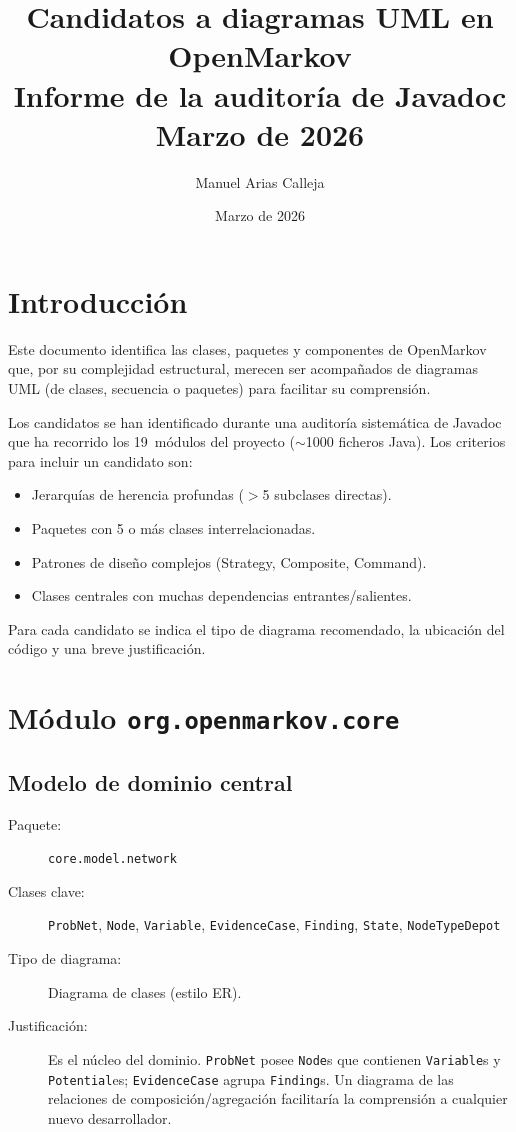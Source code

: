\documentclass[11pt,a4paper]{article}
\title{Candidatos a diagramas UML en OpenMarkov\\
       \large Informe de la auditor\'ia de Javadoc\\[4pt]
       \normalsize Marzo de 2026}
\author{Manuel Arias Calleja}
\date{Marzo de 2026}
\newcommand{\code}[1]{\texttt{#1}}
\newcommand{\pkg}[1]{\texttt{\small #1}}
\begin{document}
\maketitle
\tableofcontents
\newpage

\section{Introducci\'on}

Este documento identifica las clases, paquetes y componentes de
OpenMarkov que, por su complejidad estructural, merecen ser acompa\~nados
de diagramas UML (de clases, secuencia o paquetes) para facilitar su
comprensi\'on.

Los candidatos se han identificado durante una auditor\'ia sistem\'atica
de Javadoc que ha recorrido los 19~m\'odulos del proyecto ($\sim$1000
ficheros Java).  Los criterios para incluir un candidato son:

\begin{itemize}[nosep]
  \item Jerarqu\'ias de herencia profundas ($>$5 subclases directas).
  \item Paquetes con 5 o m\'as clases interrelacionadas.
  \item Patrones de dise\~no complejos (Strategy, Composite, Command).
  \item Clases centrales con muchas dependencias entrantes/salientes.
\end{itemize}

Para cada candidato se indica el tipo de diagrama recomendado, la
ubicaci\'on del c\'odigo y una breve justificaci\'on.

\section{M\'odulo \code{org.openmarkov.core}}

\subsection{Modelo de dominio central}

\begin{description}
  \item[Paquete:] \pkg{core.model.network}
  \item[Clases clave:] \code{ProbNet}, \code{Node}, \code{Variable},
        \code{EvidenceCase}, \code{Finding}, \code{State},
        \code{NodeTypeDepot}
  \item[Tipo de diagrama:] Diagrama de clases (estilo ER).
  \item[Justificaci\'on:] Es el n\'ucleo del dominio.  \code{ProbNet}
        posee \code{Node}s que contienen \code{Variable}s y
        \code{Potential}es; \code{EvidenceCase} agrupa \code{Finding}s.
        Un diagrama de las relaciones de composici\'on/agregaci\'on
        facilitar\'ia la comprensi\'on a cualquier nuevo desarrollador.
\end{description}
\end{document}
